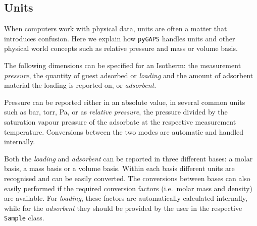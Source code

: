 \subsection{Units}

When computers work with physical data, units are often a matter 
that introduces confusion. Here we explain how \texttt{pyGAPS} 
handles units and other physical world concepts such as relative
pressure and mass or volume basis.

The following dimensions can be specified for an Isotherm: 
the measurement \textit{pressure}, the quantity of guest adsorbed
or \textit{loading} and the amount of adsorbent material
the loading is reported on, or \textit{adsorbent}.

Pressure can be reported either in an absolute value, in several 
common units such as \si{\bar}, torr, \si{\pascal}, or as 
\textit{relative pressure}, the pressure divided by the saturation 
vapour pressure of the adsorbate at the respective measurement
temperature. Conversions between the two modes are automatic 
and handled internally.

Both the \textit{loading} and \textit{adsorbent} can be reported
in three different bases: a molar basis, a mass basis or a volume
basis. Within each basis different units are recognised and can be
easily converted. The conversions between bases can also
easily performed if the required conversion factors (i.e.\ molar 
mass and density) are available. For \textit{loading}, these 
factors are automatically calculated internally, while
for the \textit{adsorbent} they should be provided by the user 
in the respective \texttt{Sample} class.